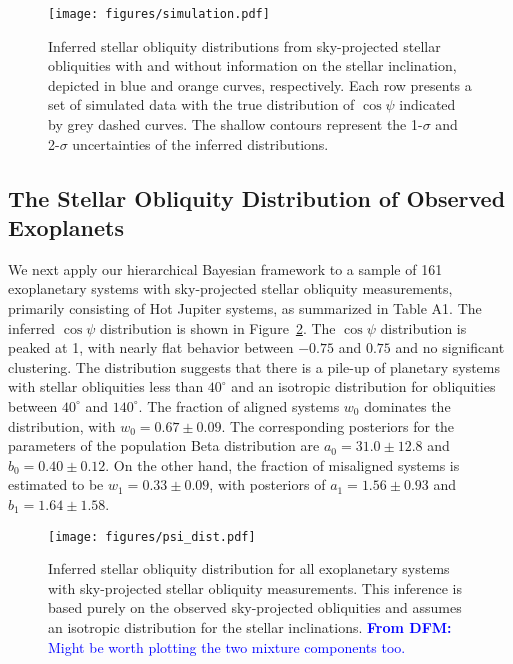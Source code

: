 \documentclass[twocolumn,times]{aastex631}
\newcommand{\dfm}[1]{\textcolor{blue}{\textbf{From DFM:} #1}}
\begin{document}
\begin{figure}[ht!]
    \texttt{[image: figures/simulation.pdf]}
    \caption{Inferred stellar obliquity distributions from sky-projected stellar obliquities with and without information on the stellar inclination, depicted in blue and orange curves, respectively. Each row presents a set of simulated data with the true distribution of $\cos{\psi}$ indicated by grey dashed curves. The shallow contours represent the 1-$\sigma$ and 2-$\sigma$ uncertainties of the inferred distributions.}
    \label{fig:simulation}
\end{figure}

\subsection{The Stellar Obliquity Distribution of Observed Exoplanets}

We next apply our hierarchical Bayesian framework to a sample of 161 exoplanetary systems with sky-projected stellar obliquity measurements, primarily consisting of Hot Jupiter systems, as summarized in \cite{Albrecht22} Table A1.
The inferred $\cos{\psi}$ distribution is shown in Figure~\ref{fig:psi_dist}. The $\cos{\psi}$ distribution is peaked at 1, with nearly flat behavior between $-0.75$ and $0.75$ and no significant clustering. The distribution suggests that there is a pile-up of planetary systems with stellar obliquities less than $40^\circ$ and an isotropic distribution for obliquities between $40^\circ$ and $140^\circ$.
The fraction of aligned systems $w_0$ dominates the distribution, with $w_0 = 0.67 \pm 0.09$. The corresponding posteriors for the parameters of the population Beta distribution are $a_0 = 31.0\pm12.8$ and $b_0 = 0.40\pm0.12$. On the other hand, the fraction of misaligned systems is estimated to be $w_1 = 0.33 \pm 0.09$, with posteriors of $a_1 = 1.56\pm0.93$ and $b_1 = 1.64\pm1.58$.

\begin{figure}[ht!]
    \begin{centering}
        \texttt{[image: figures/psi\_dist.pdf]}
        \caption{Inferred stellar obliquity distribution for all exoplanetary systems with sky-projected stellar obliquity measurements. This inference is based purely on the observed sky-projected obliquities and assumes an isotropic distribution for the stellar inclinations.
        \dfm{Might be worth plotting the two mixture components too.}}
        \label{fig:psi_dist}
    \end{centering}
\end{figure}
\end{document}
